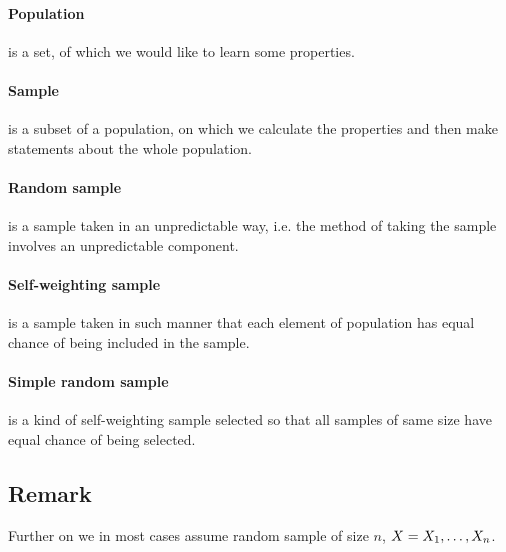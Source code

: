 \paragraph{Population} is a set, of which we would like to learn some properties.
  
\paragraph{Sample} is a subset of a population, on which we calculate the properties and then make
statements about the whole population.

\paragraph{Random sample} is a sample taken in an unpredictable way, i.e. the method of taking the
sample involves an unpredictable component.

\paragraph{Self-weighting sample} is a sample taken in such manner that each element of population has equal
chance of being included in the sample.

\paragraph{Simple random sample} is a kind of self-weighting sample selected so that all samples of
same size have equal chance of being selected.

\subsection*{Remark}
Further on we in most cases assume random sample of size $n$, $X = X_{1}, \ldots, X_{n}$.
